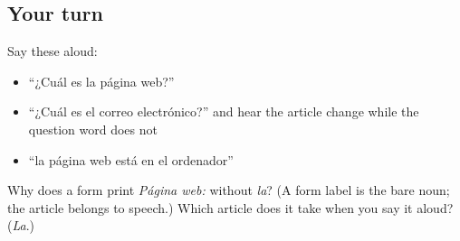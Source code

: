 \subsection*{Your turn}
Say these aloud:

\begin{itemize}
\raggedright
  \item \textquotedblleft{}¿Cuál es la página web?\textquotedblright{}
  \item \textquotedblleft{}¿Cuál es el correo electrónico?\textquotedblright{} and hear the article change while the question word does not
  \item \textquotedblleft{}la página web está en el ordenador\textquotedblright{}
\end{itemize}

\begin{tcolorbox}[breakable,colback=teal!4,colframe=teal!35!black,title={Before you move on}]
Why does a form print \emph{Página web:} without \emph{la}? (A form label is the bare noun; the article belongs to speech.) Which article does it take when you say it aloud? (\emph{La}.)
\end{tcolorbox}
